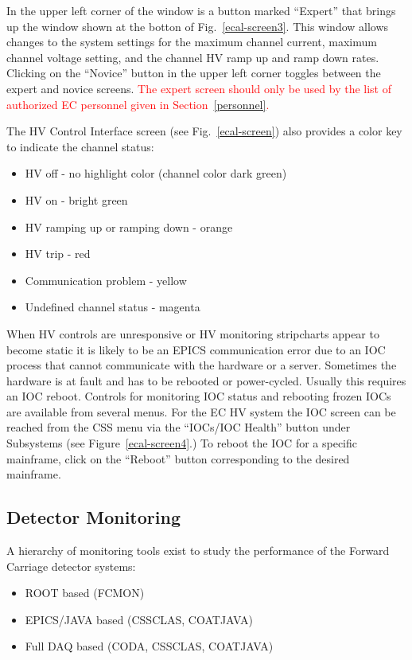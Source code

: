 \documentclass[letterpaper,10pt]{article}
\begin{document}
In the upper left corner of the window is a button marked ``Expert'' that
brings up the window shown at the botton of Fig.~\ref{ecal-screen3}. This window allows changes to the system settings
for the maximum channel current, maximum channel voltage setting, and the channel HV ramp up and 
ramp down rates.   Clicking on the ``Novice'' button
in the upper left corner toggles between the 
expert and novice screens. \textcolor{red}{The expert screen should only be used by the list of 
authorized EC personnel given in Section~\ref{personnel}.} 

The HV Control Interface screen (see Fig.~\ref{ecal-screen}) also provides a color key to indicate 
the channel status:

\begin{itemize}
\item HV off - no highlight color (channel color dark green)
\item HV on - bright green
\item HV ramping up or ramping down - orange
\item HV trip - red
\item Communication problem - yellow
\item Undefined channel status - magenta
\end{itemize}

When HV controls are unresponsive or HV monitoring stripcharts appear to become static it is likely
to be an EPICS communication error due to an IOC process that cannot communicate with the hardware or a
server.  Sometimes the hardware is at fault and has to be rebooted or power-cycled.  Usually this
requires an IOC reboot.  Controls for monitoring IOC status and rebooting frozen IOCs are available from
several menus.  For the EC HV system the IOC screen can be reached from the CSS menu via the ``IOCs/IOC Health''
button under Subsystems (see Figure~\ref{ecal-screen4}.)  To reboot the
IOC for a specific mainframe, click on the ``Reboot'' button corresponding to the desired mainframe.



\subsection{Detector Monitoring}
\label{monitoring}

A hierarchy of monitoring tools exist to study the performance of the Forward Carriage detector systems:

\begin{itemize}
\item ROOT based (FCMON)
\item EPICS/JAVA based (CSSCLAS, COATJAVA)
\item Full DAQ based (CODA, CSSCLAS, COATJAVA)
\end{itemize}
\end{document}
